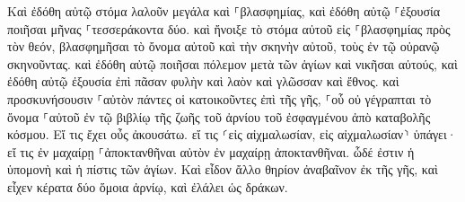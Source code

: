 \documentclass{openreader}
\begin{document}
Καὶ ἐδόθη αὐτῷ στόμα λαλοῦν μεγάλα καὶ ⸀βλασφημίας, καὶ ἐδόθη αὐτῷ ⸀ἐξουσία ποιῆσαι μῆνας ⸀τεσσεράκοντα δύο. 
καὶ ἤνοιξε τὸ στόμα αὐτοῦ εἰς ⸀βλασφημίας πρὸς τὸν θεόν, βλασφημῆσαι τὸ ὄνομα αὐτοῦ καὶ τὴν σκηνὴν αὐτοῦ, τοὺς ἐν τῷ οὐρανῷ σκηνοῦντας. 
καὶ ἐδόθη αὐτῷ ποιῆσαι πόλεμον μετὰ τῶν ἁγίων καὶ νικῆσαι αὐτούς, καὶ ἐδόθη αὐτῷ ἐξουσία ἐπὶ πᾶσαν φυλὴν καὶ λαὸν καὶ γλῶσσαν καὶ ἔθνος. 
καὶ προσκυνήσουσιν ⸀αὐτὸν πάντες οἱ κατοικοῦντες ἐπὶ τῆς γῆς, ⸀οὗ οὐ γέγραπται τὸ ὄνομα ⸀αὐτοῦ ἐν τῷ βιβλίῳ τῆς ζωῆς τοῦ ἀρνίου τοῦ ἐσφαγμένου ἀπὸ καταβολῆς κόσμου. 
Εἴ τις ἔχει οὖς ἀκουσάτω. 
εἴ τις ⸂εἰς αἰχμαλωσίαν, εἰς αἰχμαλωσίαν⸃ ὑπάγει· εἴ τις ἐν μαχαίρῃ ⸀ἀποκτανθῆναι αὐτὸν ἐν μαχαίρῃ ἀποκτανθῆναι. ὧδέ ἐστιν ἡ ὑπομονὴ καὶ ἡ πίστις τῶν ἁγίων. 
Καὶ εἶδον ἄλλο θηρίον ἀναβαῖνον ἐκ τῆς γῆς, καὶ εἶχεν κέρατα δύο ὅμοια ἀρνίῳ, καὶ ἐλάλει ὡς δράκων. 
\end{document}

